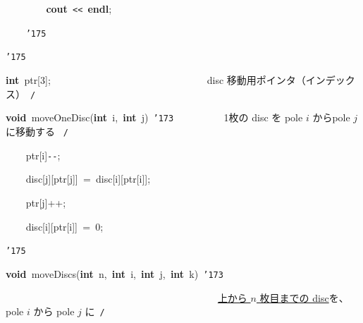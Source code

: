\documentclass[a4paper,10pt]{article}
\def\mc{\relax}
\begin{document}
\noindent
\mbox{}{\tt\mc \ }{\tt\mc \ }{\tt\mc \ }{\tt\mc \ }{\tt\mc \ }{\tt\mc \ }{\tt\mc \ }{\tt\mc \ }\textbf{cout}{\tt\mc \ }{\tt <}{\tt <}{\tt\mc \ }\textbf{endl};

\noindent
\mbox{}{\tt\mc \ }{\tt\mc \ }{\tt\mc \ }{\tt\mc \ }{\tt\char'175}

\noindent
\mbox{}{\tt\char'175}

\noindent
\mbox{}\hfill

\noindent
\mbox{}\textbf{int}{\tt\mc \ }ptr[3];{\tt\mc \ }{\tt\mc \ }{\tt\mc \ }{\tt\mc \ }{\tt\mc \ }{\tt\mc \ }{\tt\mc \ }{\tt\mc \ }{\tt\mc \ }{\tt\mc \ }{\tt\mc \ }{\tt\mc \ }{\tt\mc \ }{\tt\mc \ }{\tt\mc \ }{\tt\mc \ }{\tt\mc \ }{\tt\mc \ }{\tt\mc \ }{\tt\mc \ }{\tt\mc \ }{\tt\mc \ }{\tt\mc \ }{\tt\mc \ }{\tt\mc \ }{\tt\mc \ }{\tt\mc \ }{\tt\mc \ }{\tt\mc \ }\rm\mc {\tt /}{\tt *}\  \ disc 移動用ポインタ（インデックス）\hfill \rm\mc \ {\tt *}{\tt /}
\tt\mc 

\noindent
\mbox{}\hfill

\noindent
\mbox{}\textbf{void}{\tt\mc \ }moveOneDisc(\textbf{int}{\tt\mc \ }i,{\tt\mc \ }\textbf{int}{\tt\mc \ }j){\tt\mc \ }{\tt\char'173}{\tt\mc \ }{\tt\mc \ }{\tt\mc \ }{\tt\mc \ }{\tt\mc \ }{\tt\mc \ }{\tt\mc \ }{\tt\mc \ }\rm\mc {\tt /}{\tt *}\  \ 1枚の disc を pole $i$ からpole $j$ に移動する \hfill \rm\mc \ {\tt *}{\tt /}
\tt\mc 

\noindent
\mbox{}{\tt\mc \ }{\tt\mc \ }{\tt\mc \ }{\tt\mc \ }ptr[i]{\tt -}{\tt -};

\noindent
\mbox{}{\tt\mc \ }{\tt\mc \ }{\tt\mc \ }{\tt\mc \ }disc[j][ptr[j]]{\tt\mc \ }={\tt\mc \ }disc[i][ptr[i]];

\noindent
\mbox{}{\tt\mc \ }{\tt\mc \ }{\tt\mc \ }{\tt\mc \ }ptr[j]++;

\noindent
\mbox{}{\tt\mc \ }{\tt\mc \ }{\tt\mc \ }{\tt\mc \ }disc[i][ptr[i]]{\tt\mc \ }={\tt\mc \ }0;

\noindent
\mbox{}{\tt\char'175}

\noindent
\mbox{}\hfill

\noindent
\mbox{}\textbf{void}{\tt\mc \ }moveDiscs(\textbf{int}{\tt\mc \ }n,{\tt\mc \ }\textbf{int}{\tt\mc \ }i,{\tt\mc \ }\textbf{int}{\tt\mc \ }j,{\tt\mc \ }\textbf{int}{\tt\mc \ }k){\tt\mc \ }{\tt\char'173}

\noindent
\mbox{}{\tt\mc \ }{\tt\mc \ }{\tt\mc \ }{\tt\mc \ }{\tt\mc \ }{\tt\mc \ }{\tt\mc \ }{\tt\mc \ }{\tt\mc \ }{\tt\mc \ }{\tt\mc \ }{\tt\mc \ }{\tt\mc \ }{\tt\mc \ }{\tt\mc \ }{\tt\mc \ }{\tt\mc \ }{\tt\mc \ }{\tt\mc \ }{\tt\mc \ }{\tt\mc \ }{\tt\mc \ }{\tt\mc \ }{\tt\mc \ }{\tt\mc \ }{\tt\mc \ }{\tt\mc \ }{\tt\mc \ }{\tt\mc \ }{\tt\mc \ }{\tt\mc \ }{\tt\mc \ }{\tt\mc \ }{\tt\mc \ }{\tt\mc \ }{\tt\mc \ }{\tt\mc \ }{\tt\mc \ }{\tt\mc \ }{\tt\mc \ }\rm\mc {\tt /}{\tt *}\  \ \underline{\textsf{上から $n$ 枚目までの disc}}を、pole $i$ から pole $j$ に\hfill \rm\mc \ {\tt *}{\tt /}
\tt\mc 
\end{document}
